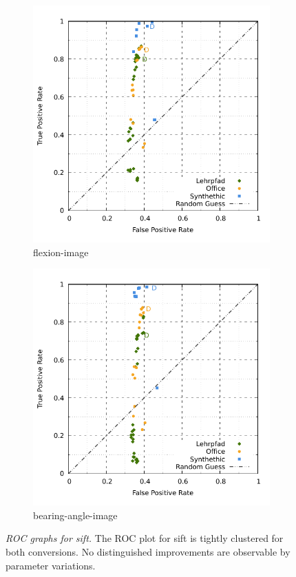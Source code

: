 \begin{figure}[H]
\begin{subfigure}[t]{0.45\linewidth}
    \includegraphics[width=\linewidth]{chapter06/results/SIFT/flexion/roc.pdf}%
    \caption{\gls{flexion-image}}
\end{subfigure}\quad
\begin{subfigure}[t]{0.45\linewidth}
    \includegraphics[width=\linewidth]{chapter06/results/SIFT/bearing/roc.pdf}
    \caption{\gls{bearing-angle-image}}
\end{subfigure}
\caption[\acrshort{ROC} graphs for \acrshort{sift}]{\emph{\acrshort{ROC} graphs for \acrshort{sift}.} The \acrshort{ROC} plot for \acrshort{sift} is tightly clustered for both conversions. No distinguished improvements are observable by parameter variations.}\label{fig:roc_sift}
\end{figure}
